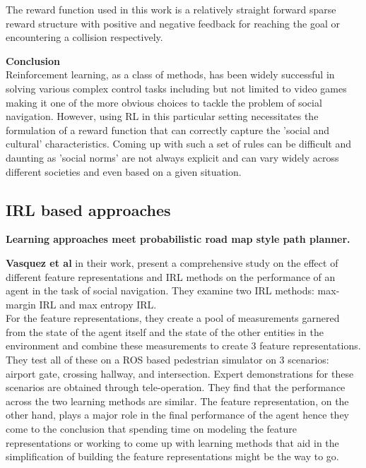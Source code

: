 The reward function used in this work is a relatively straight forward sparse reward structure with positive and negative feedback for reaching the goal or encountering a collision respectively.

\textbf{Conclusion}\\
Reinforcement learning, as a class of methods, has been widely successful in solving various complex control tasks including but not limited to video games making it one of the more obvious choices to tackle the problem of social navigation. 
However, using RL in this particular setting necessitates the formulation of a reward function that can correctly capture the 'social and cultural' characteristics. Coming up with such a set of rules can be difficult and daunting as 'social norms' are not always explicit and can vary widely across different societies and even based on a given situation.\\

\subsection*{IRL based approaches}
\textbf{Learning approaches meet probabilistic road map style path planner.}

\textbf{Vasquez et al} in their work, present a comprehensive study on the effect of different feature representations and IRL methods on the performance of an agent in the task of social navigation. They examine two IRL methods:
max-margin IRL and max entropy IRL.\\
For the feature representations, they create a pool of measurements garnered from the state of the agent itself and the state of the other entities in the environment and combine these measurements to create 3 feature representations. \\
They test all of these on a ROS based pedestrian simulator on 3 scenarios: airport gate, crossing hallway, and intersection. Expert demonstrations for these scenarios are obtained through tele-operation. They find that the performance across the two learning methods are similar. The feature representation, on the other hand, plays a major role in the final performance of the agent hence they come to the conclusion that spending time on modeling the feature representations or working to come up with learning methods that aid in the simplification of building the feature representations might be the way to go.\\

